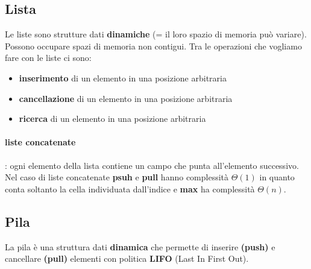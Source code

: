 \documentclass{article}
\begin{document}
\subsection{Lista} %
Le liste sono strutture dati \textbf{dinamiche} (= il loro spazio di memoria può variare). 
Possono occupare spazi di
 memoria non contigui. Tra le operazioni che vogliamo fare con le liste ci sono:
 \begin{itemize}
    \item \textbf{inserimento} di un elemento in una posizione arbitraria
    \item \textbf{cancellazione} di un elemento in una posizione arbitraria
    \item \textbf{ricerca} di un elemento in una posizione arbitraria
 \end{itemize}
 
 \paragraph{liste concatenate}: ogni elemento della lista contiene un campo che punta all'elemento successivo.
 Nel caso di liste concatenate \textbf{psuh}
e \textbf{pull} hanno complessità $\Theta(1)$ in quanto conta soltanto la cella individuata dall'indice
 e \textbf{max} ha complessità $\Theta(n)$.
 
\subsection{Pila} %
La pila è una struttura dati \textbf{dinamica} che permette di inserire \textbf{(push)} e cancellare \textbf{(pull)}
 elementi con politica \textbf{LIFO} (Last In First Out).
\end{document}
